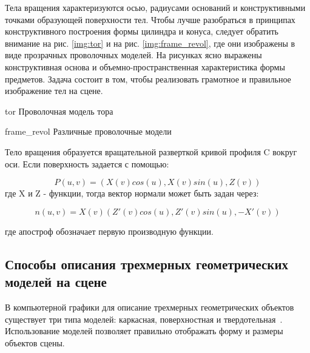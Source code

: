 Тела вращения характеризуются осью, радиусами оснований и конструктивными точками образующей поверхности тел.
Чтобы лучше разобраться в принципах конструктивного построения формы цилиндра и конуса,
следует обратить внимание на рис. \ref{img:tor} и на рис. \ref{img:frame_revol}, где они изображены в виде прозрачных проволочных моделей.
На рисунках ясно выражены конструктивная основа и объемно-пространственная характеристика формы предметов.
Задача состоит в том, чтобы реализовать грамотное и правильное изображение тел на сцене.

\img{60mm}
{tor} %
{Проволочная модель тора} %

\img{100mm}
{frame_revol} %
{Различные проволочные модели} %

Тело вращения образуется вращательной разверткой кривой профиля C вокруг оси. Если поверхность задается с помощью:\newline

\begin{equation}
P(u, v) = (X(v)cos(u), X(v)sin(u), Z(v))
\end{equation}
где X и Z - функции, тогда вектор нормали может быть задан через:\newline

\begin{equation}
n(u, v) = X(v) (Z' (v)cos(u), Z' (v)sin(u), - X' (v))
\end{equation}

где апостроф обозначает первую производную функции.


\subsection{Способы описания трехмерных геометрических моделей на сцене}

В компьютерной графики для описание трехмерных геометрических объектов существует три типа моделей: каркасная, поверхностная и твердотельная~\cite{aaymodelmethod}. Использование моделей позволяет правильно отображать форму и размеры объектов сцены.

